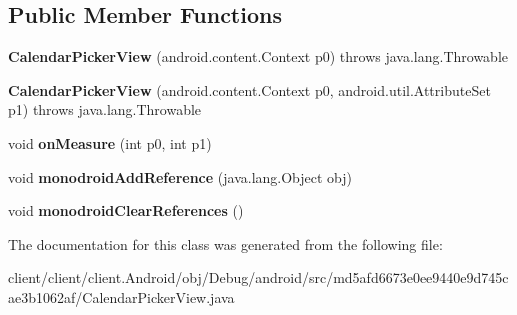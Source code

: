 \subsection*{Public Member Functions}
\begin{DoxyCompactItemize}
\item 
\hypertarget{classmd5afd6673e0ee9440e9d745cae3b1062af_1_1CalendarPickerView_abb177531324bd23877540cab8e41a80a}{}{\bfseries Calendar\+Picker\+View} (android.\+content.\+Context p0)  throws java.\+lang.\+Throwable 	\label{classmd5afd6673e0ee9440e9d745cae3b1062af_1_1CalendarPickerView_abb177531324bd23877540cab8e41a80a}

\item 
\hypertarget{classmd5afd6673e0ee9440e9d745cae3b1062af_1_1CalendarPickerView_a4d5b3441be3462be56752664080a9dee}{}{\bfseries Calendar\+Picker\+View} (android.\+content.\+Context p0, android.\+util.\+Attribute\+Set p1)  throws java.\+lang.\+Throwable 	\label{classmd5afd6673e0ee9440e9d745cae3b1062af_1_1CalendarPickerView_a4d5b3441be3462be56752664080a9dee}

\item 
\hypertarget{classmd5afd6673e0ee9440e9d745cae3b1062af_1_1CalendarPickerView_aaecb4bde3ee05e7cfbffd55293d440cc}{}void {\bfseries on\+Measure} (int p0, int p1)\label{classmd5afd6673e0ee9440e9d745cae3b1062af_1_1CalendarPickerView_aaecb4bde3ee05e7cfbffd55293d440cc}

\item 
\hypertarget{classmd5afd6673e0ee9440e9d745cae3b1062af_1_1CalendarPickerView_ab45e06ca94ae7b2ae2f9f7a36d8640f5}{}void {\bfseries monodroid\+Add\+Reference} (java.\+lang.\+Object obj)\label{classmd5afd6673e0ee9440e9d745cae3b1062af_1_1CalendarPickerView_ab45e06ca94ae7b2ae2f9f7a36d8640f5}

\item 
\hypertarget{classmd5afd6673e0ee9440e9d745cae3b1062af_1_1CalendarPickerView_a33da6ad0cb479d3d6875b1822204c0c6}{}void {\bfseries monodroid\+Clear\+References} ()\label{classmd5afd6673e0ee9440e9d745cae3b1062af_1_1CalendarPickerView_a33da6ad0cb479d3d6875b1822204c0c6}

\end{DoxyCompactItemize}


The documentation for this class was generated from the following file\+:\begin{DoxyCompactItemize}
\item 
client/client/client.\+Android/obj/\+Debug/android/src/md5afd6673e0ee9440e9d745cae3b1062af/Calendar\+Picker\+View.\+java\end{DoxyCompactItemize}
